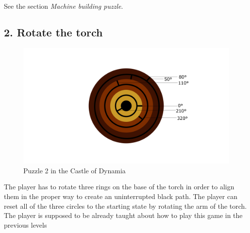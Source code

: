 
%

%

See the section \textit{Machine building puzzle}.

\subsection{2. Rotate the torch}

\begin{figure}[H]
  \centering
  \includegraphics[width=\textwidth]{Images/Puzzles/torchPuzzleStart}
  \caption{Puzzle 2 in the Castle of Dynamia}
\end{figure}

The player has to rotate three rings on the base of the torch in order to align them in the proper way to create an uninterrupted black path. The player can reset all of the three circles to the starting state by rotating the arm of the torch. The player is supposed to be already taught about how to play this game in the previous levels

